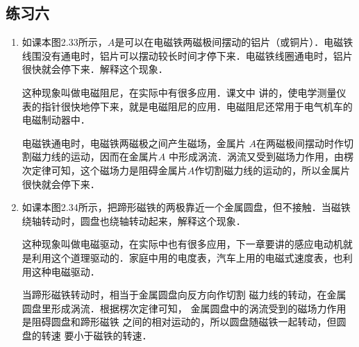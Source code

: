 \subsection{练习六}
\begin{enumerate}
    \item 如课本图2.33所示，$A$是可以在电磁铁两磁极间摆动的铝片（或铜片）．电磁铁线围没有通电时，铝片可以摆动较长时间才停下来．电磁铁线圈通电时，铝片很快就会停下来．解释这个现象．
    
这种现象叫做电磁阻尼，在实际中有很多应用．课文中
讲的，使电学测量仪表的指针很快地停下来，就是电磁阻尼的应用．电磁阻尼还常用于电气机车的电磁制动器中．

\begin{solution}
    电磁铁通电时，电磁铁两磁极之间产生磁场，金属片
    $A$在两磁极间摆动时作切割磁力线的运动，因而在金属片$A$
    中形成涡流．涡流又受到磁场力作用，由楞次定律可知，这个磁场力是阻碍金属片$A$作切割磁力线的运动的，所以金属片
    很快就会停下来．
\end{solution}


\item 如课本图2.34所示，把蹄形磁铁的两极靠近一个金属圆盘，但不接触．当磁铁绕轴转动时，圆盘也绕轴转动起来，解释这个现象．

这种现象叫做电磁驱动，在实际中也有很多应用，下一章要讲的感应电动机就是利用这个道理驱动的．家庭中用的电度表，汽车上用的电磁式速度表，也利用这种电磁驱动．

\begin{solution}
    当蹄形磁铁转动时，相当于金属圆盘向反方向作切割
    磁力线的转动，在金属圆盘里形成涡流．根据楞次定律可知，
    金属圆盘中的涡流受到的磁场力作用是阻碍圆盘和蹄形磁铁
    之间的相对运动的，所以圆盘随磁铁一起转动，但圆盘的转速
    要小于磁铁的转速．
\end{solution}

\end{enumerate}



